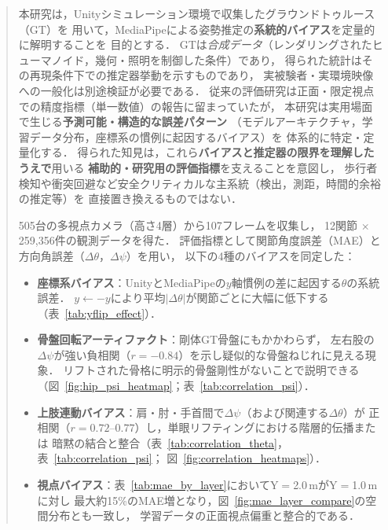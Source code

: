 \documentclass[fleqn]{ieej}
\begin{document}
\begin{abstract}
本研究は，Unityシミュレーション環境で収集したグラウンドトゥルース（GT）を
用いて，MediaPipeによる姿勢推定の\textbf{系統的バイアス}を定量的に解明することを
目的とする．
GTは\emph{合成データ}（レンダリングされたヒューマノイド，幾何・照明を制御した条件）であり，
得られた統計はその再現条件下での推定器挙動を示すものであり，
実被験者・実環境映像への一般化は別途検証が必要である．
従来の評価研究は正面・限定視点での精度指標（単一数値）の報告に留まっていたが，
本研究は実用場面で生じる\textbf{予測可能・構造的な誤差パターン}
（モデルアーキテクチャ，学習データ分布，座標系の慣例に起因するバイアス）を
体系的に特定・定量化する．
得られた知見は，これら\textbf{バイアスと推定器の限界を理解したうえで}用いる
\textbf{補助的・研究用の評価指標}を支えることを意図し，
歩行者検知や衝突回避など安全クリティカルな主系統（検出，測距，時間的余裕の推定等）を
直接置き換えるものではない．

505台の多視点カメラ（高さ4層）から107フレームを収集し，
12関節 $\times$ 259,356件の観測データを得た．
評価指標として関節角度誤差（MAE）と方向角誤差（$\Delta\theta$，$\Delta\psi$）を用い，
以下の4種のバイアスを同定した：

\begin{itemize}\itemsep0pt
  \item \textbf{座標系バイアス}：UnityとMediaPipeの$y$軸慣例の差に起因する$\theta$の系統誤差．
        $y \leftarrow -y$により平均$|\Delta\theta|$が関節ごとに大幅に低下する（表~\ref{tab:yflip_effect}）．
  \item \textbf{骨盤回転アーティファクト}：剛体GT骨盤にもかかわらず，
        左右股の$\Delta\psi$が強い負相関（$r=-0.84$）を示し疑似的な骨盤ねじれに見える現象．
        リフトされた骨格に明示的骨盤剛性がないことで説明できる
        （図~\ref{fig:hip_psi_heatmap}；表~\ref{tab:correlation_psi}）．
  \item \textbf{上肢連動バイアス}：肩・肘・手首間で$\Delta\psi$（および関連する$\Delta\theta$）が
        正相関（$r=0.72$--$0.77$）し，単眼リフティングにおける階層的伝播または
        暗黙の結合と整合（表~\ref{tab:correlation_theta}，表~\ref{tab:correlation_psi}；
        図~\ref{fig:correlation_heatmaps}）．
  \item \textbf{視点バイアス}：表~\ref{tab:mae_by_layer}においてY$=$2.0\,mがY$=$1.0\,mに対し
        最大約15\%のMAE増となり，図~\ref{fig:mae_layer_compare}の空間分布とも一致し，
        学習データの正面視点偏重と整合的である．
\end{itemize}


\end{abstract}
\end{document}
